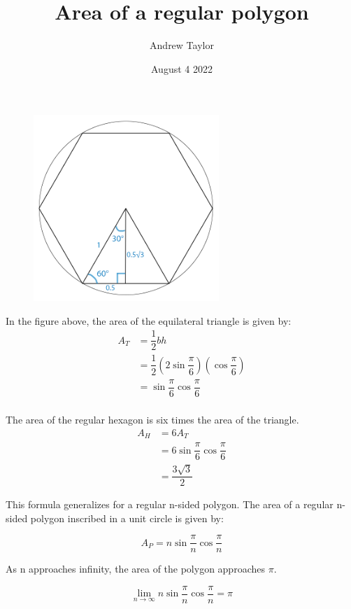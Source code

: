 \documentclass{article}
\title{Area of a regular polygon}
\author{Andrew Taylor}
\date{August 4 2022}
\begin{document}
\maketitle

\begin{figure}[h]
\centering
\includegraphics[width=7cm]{regularhexagoninscribed}
\end{figure}

In the figure above, the area of the equilateral triangle is given by:
\begin{align*}
A_{T} &= \dfrac{1}{2}bh \\
&= \dfrac{1}{2}\left(2\sin\dfrac{\pi}{6}\right)\left(\cos\dfrac{\pi}{6}\right) \\
&= \sin\dfrac{\pi}{6}\cos\dfrac{\pi}{6} \\
\end{align*}

The area of the regular hexagon is six times the area of the triangle.
\begin{align*}
A_{H} &= 6A_{T} \\
&= 6\sin\dfrac{\pi}{6}\cos\dfrac{\pi}{6} \\
&=\dfrac{3\sqrt{3}}{2}
\end{align*}

This formula generalizes for a regular n-sided polygon. The area of a regular n-sided polygon inscribed in a unit circle is given by:

\begin{equation}
A_{P} = n \sin \dfrac{\pi}{n} \cos \dfrac{\pi}{n}
\end{equation}

As n approaches infinity, the area of the polygon approaches $\pi$.

\begin{equation}
\lim_{n \to \infty} n \sin \dfrac{\pi}{n} \cos \dfrac{\pi}{n} = \pi
\end{equation}
\end{document}
